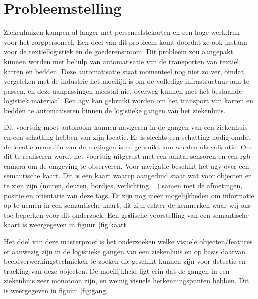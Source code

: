 
\chapter{Probleemstelling}

Ziekenhuizen kampen al langer met personeelstekorten en een hoge werkdruk voor het zorgpersoneel. Een deel van dit probleem komt doordat ze ook instaan voor de textiellogistiek en de goederenstroom.
Dit probleem zou aangepakt kunnen worden met behulp van automatisatie van de transporten van textiel, karren en bedden. Deze automatisatie staat momenteel nog niet zo ver, omdat vergeleken met de industrie het moeilijk is om de volledige
infrastructuur aan te passen, en deze aanpassingen meestal niet overweg kunnen met het bestaande logistiek materiaal. Een \gls{agv} kan gebruikt worden om het transport van karren en bedden te automatiseren binnen de logistieke gangen van het ziekenhuis.

Dit voertuig moet autonoom kunnen navigeren in de gangen van een ziekenhuis en een schatting hebben van zijn locatie.
Er is slechts een schatting nodig omdat de locatie maar \'{e}\'{e}n van de metingen is en gebruikt kan worden als validatie.
Om dit te realiseren
wordt het voertuig uitgerust met een aantal sensoren en een \gls{rgb} camera om de omgeving te observeren. Voor navigatie beschikt het \gls{agv}
over een semantische kaart.
Dit is een kaart waarop aangeduid staat wat voor objecten er te zien zijn (muren, deuren, bordjes, verlichting, ..) samen met de afmetingen, positie en ori\"{e}ntatie van deze tags.
Er zijn nog meer mogelijkheden om informatie op te nemen in een semantische kaart, dit zijn echter de kenmerken waar wij ons toe beperken voor dit onderzoek.
Een grafische voorstelling van een semantische kaart is weergegeven in figuur~\ref{fig:kaart}.

Het doel van deze masterproef is het onderzoeken welke visuele objecten/features er aanwezig zijn in de logistieke gangen van een ziekenhuis en op basis daarvan
beeldverwerkingstechnieken te zoeken die geschikt kunnen zijn voor detectie en tracking van deze objecten.
De moeilijkheid ligt erin dat de gangen in een ziekenhuis zeer monotoon zijn, en weinig visuele herkenningspunten hebben.
Dit is weergegeven in figuur~\ref{fig:gang}.

